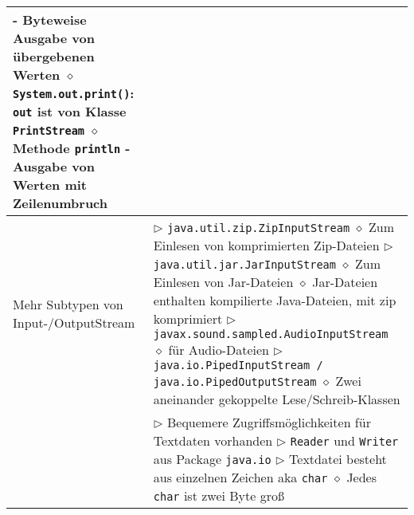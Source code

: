 \begin{longtable}{ | p{} p{} | }
{	\hspace{0.6cm} - Byteweise Ausgabe von übergebenen Werten \\
	\hspace{0.4cm} $\diamond$ \texttt{System.out.print()}: \texttt{out} ist von Klasse \texttt{PrintStream} \\
	\hspace{0.4cm} $\diamond$ Methode \texttt{println} \\
	\hspace{0.6cm} - Ausgabe von Werten mit Zeilenumbruch} \\ \hline

	\makecell[l]{Mehr Subtypen von \\Input-/OutputStream} & \makecell[l]{
	$\rhd$ \texttt{java.util.zip.ZipInputStream} \\
	\hspace{0.4cm} $\diamond$ Zum Einlesen von komprimierten Zip-Dateien \\
	$\rhd$ \texttt{java.util.jar.JarInputStream} \\
	\hspace{0.4cm} $\diamond$ Zum Einlesen von Jar-Dateien \\
	\hspace{0.4cm} $\diamond$ Jar-Dateien enthalten kompilierte Java-Dateien, mit zip komprimiert \\
	$\rhd$ \texttt{javax.sound.sampled.AudioInputStream} \\
	\hspace{0.4cm} $\diamond$ für Audio-Dateien \\
	$\rhd$ \texttt{java.io.PipedInputStream / java.io.PipedOutputStream} \\
	\hspace{0.4cm} $\diamond$ Zwei aneinander gekoppelte Lese/Schreib-Klassen
	} \\ \hline

	\makecell[l]{Textdaten direkt} & \makecell[l]{
	$\rhd$ Bequemere Zugriffsmöglichkeiten für Textdaten vorhanden \\
	$\rhd$ \texttt{Reader} und \texttt{Writer} aus Package \texttt{java.io} \\
	$\rhd$ Textdatei besteht aus einzelnen Zeichen aka \texttt{char} \\
	\hspace{0.4cm} $\diamond$ Jedes \texttt{char} ist zwei Byte gro\ss} \\ \hline


\end{longtable}
